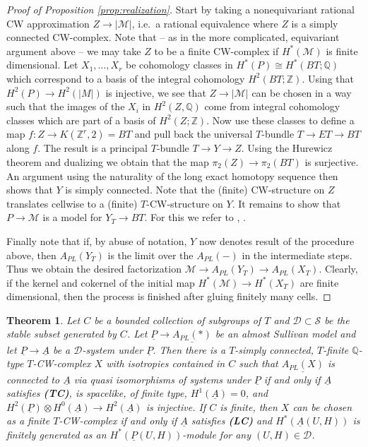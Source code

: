 \documentclass[12pt,a4paper]{article}
\newtheorem{thm}{Theorem}[section]
\theoremstyle{definition}
\begin{document}
\begin{proof}[Proof of Proposition \ref{prop:realization}]
Start by taking a nonequivariant rational CW approximation $Z\rightarrow\vert \mathcal{M}\vert$, i.e.\ a rational equivalence where $Z$ is a simply connected CW-complex.
Note that -- as in the more complicated, equivariant argument above -- we may take $Z$ to be a finite CW-complex if $H^*(\mathcal{M})$ is finite dimensional. Let $X_1,\ldots,X_r$ be cohomology classes in $H^*(P)\cong H^*(BT;\mathbb{Q})$ which correspond to a basis of the integral cohomology $H^2(BT;\mathbb{Z})$. Using that $H^2(P)\rightarrow H^2(\vert M\vert)$ is injective, we see that $Z\rightarrow\vert \mathcal{M}\vert$ can be chosen in a way such that the images of the $X_i$ in $H^2(Z,\mathbb{Q})$ come from integral cohomology classes which are part of a basis of $H^2(Z;\mathbb{Z})$. Now use these classes to define a map $f\colon Z\rightarrow K(\mathbb{Z}^r,2)=BT$ and pull back the universal $T$-bundle $T\rightarrow ET\rightarrow BT$ along $f$. The result is a principal $T$-bundle $T\rightarrow Y\rightarrow Z$.
Using the Hurewicz theorem and dualizing we obtain that the map $\pi_2(Z)\rightarrow \pi_2(BT)$ is surjective. An argument using the naturality of the long exact homotopy sequence then shows that $Y$ is simply connected. Note that the (finite) CW-structure on $Z$ translates cellwise to a (finite) $T$-CW-structure on $Y$. It remains to show that $P\rightarrow \mathcal{M}$ is a model for $Y_T\rightarrow BT$. For this we refer to \cite[Proposition, 7.17]{AlgebraicModels}, \cite[Proposition 2.7]{AmannZoller}.

Finally note that if, by abuse of notation, $Y$ now denotes result of the procedure above, then $A_{PL}(Y_T)$ is the limit over the $A_{PL}(-)$ in the intermediate steps. Thus we obtain the desired factorization $\mathcal{M}\rightarrow A_{PL}(Y_T)\rightarrow A_{PL}(X_T)$.
Clearly, if the kernel and cokernel of the initial map $H^*(\mathcal{M})\rightarrow H^*(X_T)$ are finite dimensional, then the process is finished after gluing finitely many cells.
\end{proof}



\begin{thm}\label{thm:P-realization}
Let $C$ be a bounded collection of subgroups of $T$ and $\mathcal{D}\subset \mathcal{S}$ be the stable subset generated by $C$. Let $\underline{P}\rightarrow \underline{A_{PL}(*)}$ be an almost Sullivan model and let $\underline{P}\rightarrow\underline{A}$ be a $\mathcal{D}$-system under $\underline{P}$. Then there is a $T$-simply connected, $T$-finite $\mathbb{Q}$-type $T$-CW-complex $X$ with isotropies contained in $C$ such that $\underline{A_{PL}(X)}$ is connected to $\underline{A}$ via quasi isomorphisms of systems under $\underline{P}$ if and only if $\underline{A}$ satisfies \textbf{(TC)}, is spacelike, of finite type, $H^1(\underline{A})=0$, and $H^2(\underline{P})\otimes H^0(\underline{A})\rightarrow H^2(\underline{A})$ is injective. If $C$ is finite, then $X$ can be chosen as a finite $T$-CW-complex if and only if $\underline{A}$ satisfies \textbf{(LC)} and $H^*(\underline{A}(U,H))$ is finitely generated as an $H^*(\underline{P}(U,H))$-module for any $(U,H)\in\mathcal{D}$.
\end{thm}
\end{document}
